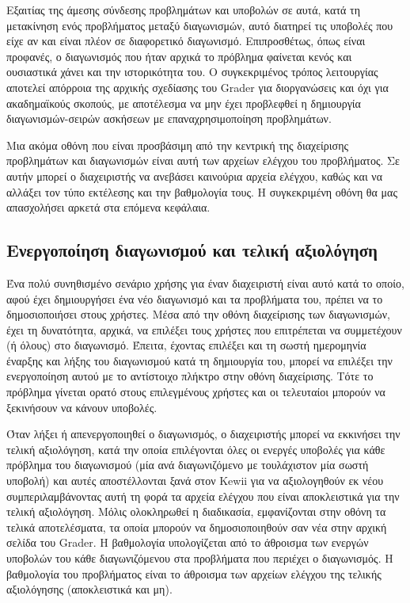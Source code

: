 \documentclass[diploma]{softlab-thesis}
\begin{document}
Εξαιτίας της άμεσης σύνδεσης προβλημάτων και υποβολών σε αυτά, κατά τη
μετακίνηση ενός προβλήματος μεταξύ διαγωνισμών, αυτό διατηρεί τις υποβολές που
είχε αν και είναι πλέον σε διαφορετικό διαγωνισμό. Επιπροσθέτως, όπως είναι
προφανές, ο διαγωνισμός που ήταν αρχικά το πρόβλημα φαίνεται κενός και
ουσιαστικά χάνει και την ιστορικότητα του. Ο συγκεκριμένος τρόπος λειτουργίας
αποτελεί απόρροια της αρχικής σχεδίασης του Grader για διοργανώσεις και όχι για
ακαδημαϊκούς σκοπούς, με αποτέλεσμα να μην έχει προβλεφθεί η δημιουργία
διαγωνισμών-σειρών ασκήσεων με επαναχρησιμοποίηση προβλημάτων.

\bigskip

Μια ακόμα οθόνη που είναι προσβάσιμη από την κεντρική της διαχείρισης προβλημάτων
και διαγωνισμών είναι αυτή των αρχείων ελέγχου του προβλήματος. Σε αυτήν μπορεί
ο διαχειριστής να ανεβάσει καινούρια αρχεία ελέγχου, καθώς και να αλλάξει τον τύπο
εκτέλεσης και την βαθμολογία τους. Η συγκεκριμένη οθόνη θα μας απασχολήσει αρκετά
στα επόμενα κεφάλαια.

\subsection{Ενεργοποίηση διαγωνισμού και τελική αξιολόγηση}

Ένα πολύ συνηθισμένο σενάριο χρήσης για έναν διαχειριστή είναι αυτό κατά το
οποίο, αφού έχει δημιουργήσει ένα νέο διαγωνισμό και τα προβλήματα του, πρέπει
να το δημοσιοποιήσει στους χρήστες. Μέσα από την οθόνη διαχείρισης των
διαγωνισμών, έχει τη δυνατότητα, αρχικά, να επιλέξει τους χρήστες που
επιτρέπεται να συμμετέχουν (ή όλους) στο διαγωνισμό. Έπειτα, έχοντας επιλέξει
και τη σωστή ημερομηνία έναρξης και λήξης του διαγωνισμού κατά τη δημιουργία
του, μπορεί να επιλέξει την ενεργοποίηση αυτού με το αντίστοιχο πλήκτρο στην
οθόνη διαχείρισης. Τότε το πρόβλημα γίνεται ορατό στους επιλεγμένους χρήστες
και οι τελευταίοι μπορούν να ξεκινήσουν να κάνουν υποβολές.

\bigskip

Όταν λήξει ή απενεργοποιηθεί ο διαγωνισμός, ο διαχειριστής μπορεί να εκκινήσει
την τελική αξιολόγηση, κατά την οποία επιλέγονται όλες οι ενεργές υποβολές για
κάθε πρόβλημα του διαγωνισμού (μία ανά διαγωνιζόμενο με τουλάχιστον μία σωστή
υποβολή) και αυτές αποστέλλονται ξανά στον Kewii για να αξιολογηθούν εκ νέου
συμπεριλαμβάνοντας αυτή τη φορά τα αρχεία ελέγχου που είναι αποκλειστικά για
την τελική αξιολόγηση. Μόλις ολοκληρωθεί η διαδικασία, εμφανίζονται στην οθόνη
τα τελικά αποτελέσματα, τα οποία μπορούν να δημοσιοποιηθούν σαν νέα στην αρχική
σελίδα του Grader. Η βαθμολογία υπολογίζεται από το άθροισμα των ενεργών
υποβολών του κάθε διαγωνιζόμενου στα προβλήματα που περιέχει ο διαγωνισμός. Η
βαθμολογία του προβλήματος είναι το άθροισμα των αρχείων ελέγχου της τελικής
αξιολόγησης (αποκλειστικά και μη).
\end{document}
